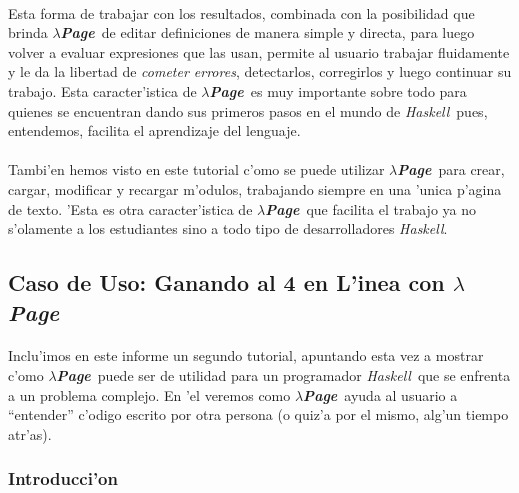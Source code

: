\documentclass[a4paper]{article}
\newcommand{\haskell}{\textsl{Haskell}}
\newcommand{\hpage}{\textbf{\textsl{$\lambda$Page}}}
\begin{document}
\paragraph{}Esta forma de trabajar con los resultados, combinada con la posibilidad que brinda \hpage\ de editar definiciones de manera simple y directa, para luego volver a evaluar expresiones que las usan, permite al usuario trabajar fluidamente y le da la libertad de \textsl{cometer errores}, detectarlos, corregirlos y luego continuar su trabajo.  Esta caracter'istica de \hpage\ es muy importante sobre todo para quienes se encuentran dando sus primeros pasos en el mundo de \haskell\ pues, entendemos, facilita el aprendizaje del lenguaje.
\paragraph{}Tambi'en hemos visto en este tutorial c'omo se puede utilizar \hpage\ para crear, cargar, modificar y recargar m'odulos, trabajando siempre en una 'unica p'agina de texto.  'Esta es otra caracter'istica de \hpage\ que facilita el trabajo ya no s'olamente a los estudiantes sino a todo tipo de desarrolladores \haskell.

\newpage
\subsection{Caso de Uso: Ganando al 4 en L'inea con \hpage}\label{secTut2}
\begin{epigraphs}
\end{epigraphs}
\paragraph{}Inclu'imos en este informe un segundo tutorial, apuntando esta vez a mostrar c'omo \hpage\ puede ser de utilidad para un programador \haskell\ que se enfrenta a un problema complejo.  En 'el veremos como \hpage\ ayuda al usuario a ``entender'' c'odigo escrito por otra persona (o quiz'a por el mismo, alg'un tiempo atr'as).
\subsubsection{Introducci'on}
\end{document}
